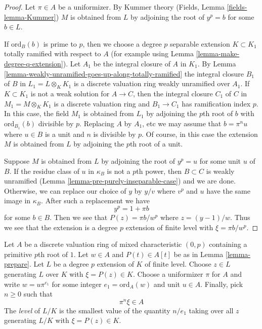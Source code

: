 \begin{proof}
Let $\pi \in A$ be a uniformizer. By Kummer theory
(Fields, Lemma \ref{fields-lemma-Kummer}) $M$ is obtained
from $L$ by adjoining the root of $y^p = b$ for some $b \in L$.

\medskip\noindent
If $\text{ord}_B(b)$ is prime to $p$, then we choose a degree $p$
separable extension $K \subset K_1$
totally ramified with respect to $A$ (for example
using Lemma \ref{lemma-make-degree-q-extension}).
Let $A_1$ be the integral closure of $A$ in $K_1$.
By Lemma \ref{lemma-weakly-unramified-goes-up-along-totally-ramified}
the integral closure $B_1$ of $B$ in $L_1 = L \otimes_K K_1$
is a discrete valuation ring weakly unramified over $A_1$.
If $K \subset K_1$ is not a weak solution for $A \to C$, then
the integral closure $C_1$ of $C$ in $M_1 = M \otimes_K K_1$ is a
discrete valuation ring and $B_1 \to C_1$ has ramification index $p$.
In this case, the field $M_1$ is obtained from $L_1$ by adjoining the
$p$th root of $b$ with $\text{ord}_{B_1}(b)$ divisible by $p$.
Replacing $A$ by $A_1$, etc we may assume that $b = \pi^n u$ where
$u \in B$ is a unit and $n$ is divisible by $p$. Of course, in
this case the extension $M$ is obtained from $L$ by adjoining
the $p$th root of a unit.

\medskip\noindent
Suppose $M$ is obtained from $L$ by adjoining the root of
$y^p = u$ for some unit $u$ of $B$. If the residue class of $u$
in $\kappa_B$ is not a $p$th power, then $B \subset C$ is
weakly unramified (Lemma \ref{lemma-pre-purely-inseparable-case})
and we are done. Otherwise, we can replace our choice of $y$ by
$y/v$ where $v^p$ and $u$ have the same image in $\kappa_B$.
After such a replacement we have
$$
y^p = 1 + \pi b
$$
for some $b \in B$. Then we see that $P(z) = \pi b/ w^p$ where
$z = (y - 1)/w$. Thus we see that the extension is a degree $p$
extension of finite level with $\xi = \pi b / w^p$.
\end{proof}

\noindent
Let $A$ be a discrete valuation ring of mixed characteristic $(0, p)$
containing a primitive $p$th root of $1$. Let $w \in A$ and $P(t) \in A[t]$
be as in Lemma \ref{lemma-prepare}. Let $L$ be a degree $p$ extension of
$K$ of finite level. Choose $z \in L$ generating $L$ over $K$
with $\xi = P(z) \in K$. Choose a uniformizer $\pi$ for $A$ and write
$w = u \pi^{e_1}$ for some integer $e_1 = \text{ord}_A(w)$
and unit $u \in A$. Finally, pick $n \geq 0$ such that
$$
\pi^n \xi \in A
$$
The {\it level} of $L/K$ is the smallest value of the quantity $n/e_1$
taking over all $z$ generating $L/K$ with $\xi = P(z) \in K$.

